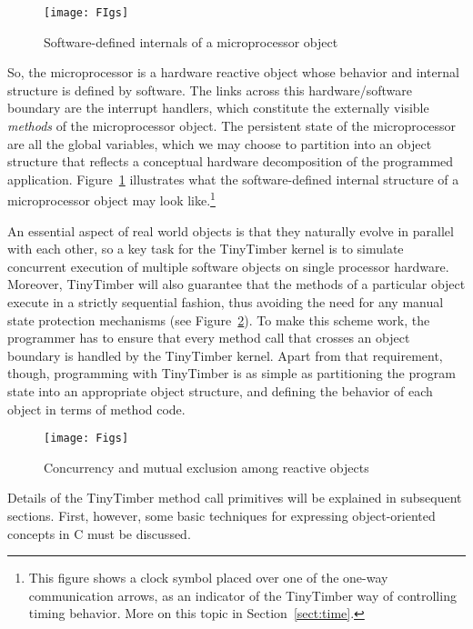 \documentclass[12pt]{article}
\begin{document}
\begin{figure}
\begin{center}
\texttt{[image: FIgs]}
\caption{\label{fig:cpu-object}Software-defined internals of a microprocessor object}
\end{center}
\end{figure}

So, the microprocessor is a hardware reactive object whose behavior and internal structure is defined by software.  The links across this hardware/software boundary are the interrupt handlers, which constitute the externally visible {\em methods} of the microprocessor object.  The persistent state of the microprocessor are all the global variables, which we may choose to partition into an object structure that reflects a conceptual hardware decomposition of the programmed application. Figure~\ref{fig:cpu-object} illustrates what the software-defined internal structure of a microprocessor object may look like.\footnote{This figure shows a clock symbol placed over one of the one-way communication arrows, as an indicator of the TinyTimber way of controlling timing behavior. More on this topic in Section~\ref{sect:time}.}

An essential aspect of real world objects is that they naturally evolve in parallel with each other, so a key task for the TinyTimber kernel is to simulate concurrent execution of multiple software objects on single processor hardware.  Moreover, TinyTimber will also guarantee that the methods of a particular object execute in a strictly sequential fashion, thus avoiding the need for any manual state protection mechanisms (see Figure~\ref{fig:concurrency}).  To make this scheme work, the programmer has to ensure that every method call that crosses an object boundary is handled by the TinyTimber kernel.  Apart from that requirement, though, programming with TinyTimber is as simple as partitioning the program state into an appropriate object structure, and defining the behavior of each object in terms of method code.

\begin{figure}
\begin{center}
\texttt{[image: Figs]}
\caption{\label{fig:concurrency}Concurrency and mutual exclusion among reactive objects}
\end{center}
\end{figure}

Details of the TinyTimber method call primitives will be explained in subsequent sections.  First, however, some basic techniques for expressing object-oriented concepts in C must be discussed.
\end{document}
